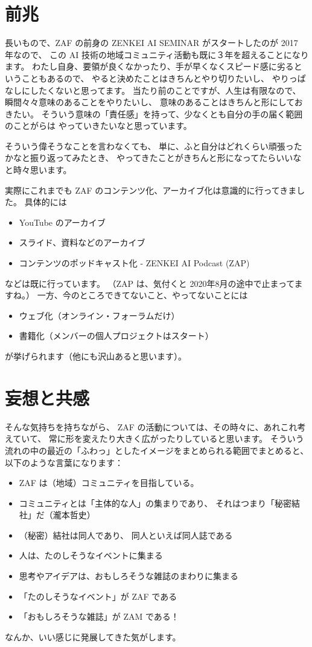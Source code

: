 \documentclass[dvipdfmx,autodetect-engine,10pt,b5paper,papersize,openany,dvipsnames]{jsbook}
\begin{document}
\begin{multicols}{2}


\section{前兆}
長いもので、ZAF の前身の ZENKEI AI SEMINAR がスタートしたのが 2017 年なので、
この AI 技術の地域コミュニティ活動も既に３年を超えることになります。
わたし自身、要領が良くなかったり、手が早くなくスピード感に劣るということもあるので、
やると決めたことはきちんとやり切りたいし、
やりっぱなしにしたくないと思ってます。
当たり前のことですが、人生は有限なので、
瞬間々々意味のあることをやりたいし、
意味のあることはきちんと形にしておきたい。
そういう意味の「責任感」を持って、少なくとも自分の手の届く範囲のことがらは
やっていきたいなと思っています。

そういう偉そうなことを言わなくても、
単に、ふと自分はどれくらい頑張ったかなと振り返ってみたとき、
やってきたことがきちんと形になってたらいいなと時々思います。

実際にこれまでも ZAF のコンテンツ化、アーカイブ化は意識的に行ってきました。
具体的には
\begin{itemize}
\item YouTube のアーカイブ
\item スライド、資料などのアーカイブ
\item コンテンツのポッドキャスト化 - ZENKEI AI Podcast (ZAP)
\end{itemize}
などは既に行っています。
（ZAP は、気付くと 2020年8月の途中で止まってますね。）
一方、今のところできてないこと、やってないことには
\begin{itemize}
\item ウェブ化（オンライン・フォーラムだけ）
\item 書籍化（メンバーの個人プロジェクトはスタート）
\end{itemize}
が挙げられます（他にも沢山あると思います）。


\section{妄想と共感}
そんな気持ちを持ちながら、
ZAF の活動については、その時々に、あれこれ考えていて、
常に形を変えたり大きく広がったりしていると思います。
そういう流れの中の最近の「ふわっ」としたイメージをまとめられる範囲でまとめると、
以下のような言葉になります：
\begin{itemize}
\item ZAF は（地域）コミュニティを目指している。
\item コミュニティとは「主体的な人」の集まりであり、
  それはつまり「秘密結社」だ（瀧本哲史）
\item （秘密）結社は同人であり、
  同人といえば同人誌である
\item 人は、たのしそうなイベントに集まる
\item 思考やアイデアは、おもしろそうな雑誌のまわりに集まる
\item 「たのしそうなイベント」が ZAF である
\item 「おもしろそうな雑誌」が ZAM である！
\end{itemize}
なんか、いい感じに発展してきた気がします。


\end{multicols}
\end{document}
